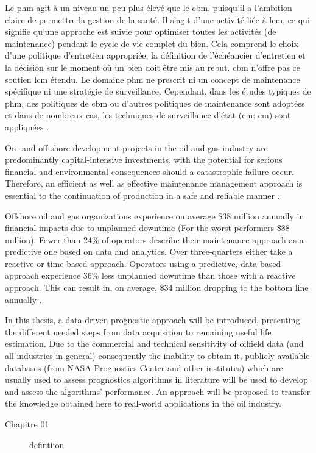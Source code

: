 Le \acrshort{phm} agit à un niveau un peu plus élevé que le \acrshort{cbm}, puisqu’il a l’ambition claire de permettre la gestion de la santé. Il s’agit d’une activité liée à \acrshort{lcm}, ce qui signifie qu’une approche est suivie pour optimiser toutes les activités (de maintenance) pendant le cycle de vie complet du bien. Cela comprend le choix d’une politique d’entretien appropriée, la définition de l'échéancier d’entretien et la décision sur le moment où un bien doit être mis au rebut. \acrshort{cbm} n’offre pas ce soutien \acrshort{lcm} étendu. Le domaine \acrshort{phm} ne prescrit ni un concept de maintenance spécifique ni une stratégie de surveillance. Cependant, dans les études typiques de \acrshort{phm}, des politiques de \acrshort{cbm} ou d’autres politiques de maintenance sont adoptées et dans de nombreux cas, les techniques de surveillance d'état (\acrlong{cm}: \acrshort{cm}) sont appliquées \cite{Tinga2014}.



On- and off-shore development projects in the oil and gas industry are predominantly capital-intensive investments, with the potential for serious financial and environmental consequences should a catastrophic failure occur. Therefore, an efficient as well as effective maintenance management approach is essential to the continuation of production in a safe and reliable manner \cite{Telford2011}.

Offshore oil and gas organizations experience on average \$38 million annually in financial impacts due to unplanned
downtime (For the worst performers \$88 million). Fewer than 24\% of operators describe their maintenance approach as a predictive one based on data and analytics. Over three-quarters either take a reactive or time-based approach. Operators using a predictive, data-based approach experience 36\% less unplanned downtime than those with a reactive approach. This can result in, on average, \$34 million dropping to the bottom line annually \cite{Eriksen2016}.

In this thesis, a data-driven prognostic approach will be introduced, presenting the different needed steps from data acquisition to remaining useful life estimation. Due to the commercial and technical sensitivity of oilfield data (and all industries in general) consequently the inability to obtain it, publicly-available databases (from NASA Prognostics Center and other institutes) which are usually used to assess prognostics algorithms in literature will be used to develop and assess the algorithms' performance. An approach will be proposed to transfer the knowledge obtained here to real-world applications in the oil industry.
\newline
\begin{description}
	\item[Chapitre 01] defintiion
\end{description}





